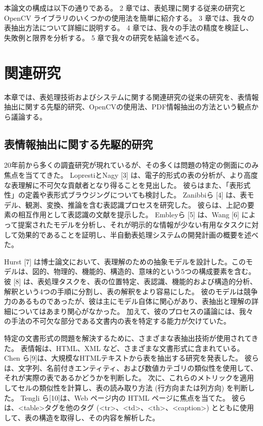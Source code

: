 \documentclass[uplatex, twocolumn,10pt]{jsarticle}
\begin{document}
本論文の構成は以下の通りである。
2 章では、表処理に関する従来の研究と OpenCV ライブラリのいくつかの使用法を簡単に紹介する。
3 章では、我々の表抽出方法について詳細に説明する。
4 章では、我々の手法の精度を検証し、失敗例と限界を分析する。
5 章で我々の研究を結論を述べる。


\section{関連研究}

本章では、表処理技術およびシステムに関する関連研究の従来の研究を、表情報抽出に関する先駆的研究、OpenCVの使用法、PDF情報抽出の方法という観点から議論する。

\subsection{表情報抽出に関する先駆的研究}
20年前から多くの調査研究が現れているが、その多くは問題の特定の側面にのみ焦点を当ててきた。
LoprestiとNagy [3] は、電子的形式の表の分析が、より高度な表理解に不可欠な貢献者となり得ることを見出した。
彼らはまた、「表形式性」の定義や表形式ブラウジングについても検討した。
Zanibbiら [4] は、表モデル、観測、変換、推論を含む表認識プロセスを研究した。
彼らは、上記の要素の相互作用として表認識の文献を提示した。
Embleyら [5] は、Wang [6] によって提案されたモデルを分析し、それが明示的な情報が少ない有用なタスクに対して効果的であることを証明し、半自動表処理システムの開発計画の概要を述べた。

Hurst [7] は博士論文において、表理解のための抽象モデルを設計した。このモデルは、図的、物理的、機能的、構造的、意味的という5つの構成要素を含む。
彼 [8] は、表処理タスクを、表の位置特定、表認識、機能的および構造的分析、解釈という4つの手順に分割し、表の解釈をより容易にした。
彼のモデルは競争力のあるものであったが、彼は主にモデル自体に関心があり、表抽出と理解の詳細についてはあまり関心がなかった。
加えて、彼のプロセスの議論には、我々の手法の不可欠な部分である文書内の表を特定する能力が欠けていた。

特定の文書形式の問題を解決するために、さまざまな表抽出技術が使用されてきた。
表情報は、HTML、XML など、さまざまな文書形式に含まれている。
Chen ら[9]は、大規模なHTMLテキストから表を抽出する研究を発表した。
彼らは、文字列、名前付きエンティティ、および数値カテゴリの類似性を使用して、それが実際の表であるかどうかを判断した。
次に、これらのメトリックを適用してセルの類似性を計算し、表の読み取り方法 (行方向または列方向) を判断した。
Tengli ら[10]は、Web ページ内の HTML ページに焦点を当てた。
彼らは、<table>タグを他のタグ (<tr>、<td>、<th>、<caption>) とともに使用して、表の構造を取得し、その内容を解析した。
\end{document}

